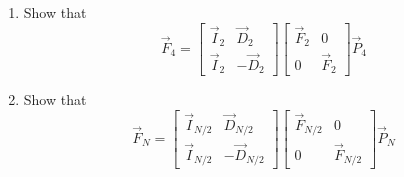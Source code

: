 \documentclass[journal,12pt,twocolumn]{IEEEtran}
\renewcommand\thesection{\arabic{section}}
\begin{document}
\begin{enumerate}[label=\arabic*.,ref=\thesection.\theenumi]
	\item Show that 
	\begin{equation}
		\vec{F}_{4}=
		\begin{bmatrix}
			\vec{I}_{2} & \vec{D}_{2} \\
			\vec{I}_{2} & -\vec{D}_{2}
		\end{bmatrix}
		\begin{bmatrix}
			\vec{F}_{2} & 0 \\
			0 & \vec{F}_{2}
		\end{bmatrix}
		\vec{P}_{4}
	\end{equation}
	\item Show that 
	\begin{equation}
		\vec{F}_{N}=
		\begin{bmatrix}
			\vec{I}_{N/2} & \vec{D}_{N/2} \\
			\vec{I}_{N/2} & -\vec{D}_{N/2}
		\end{bmatrix}
		\begin{bmatrix}
			\vec{F}_{N/2} & 0 \\
			0 & \vec{F}_{N/2}
		\end{bmatrix}
		\vec{P}_{N}
	\end{equation}
	

\end{enumerate}
\end{document}
